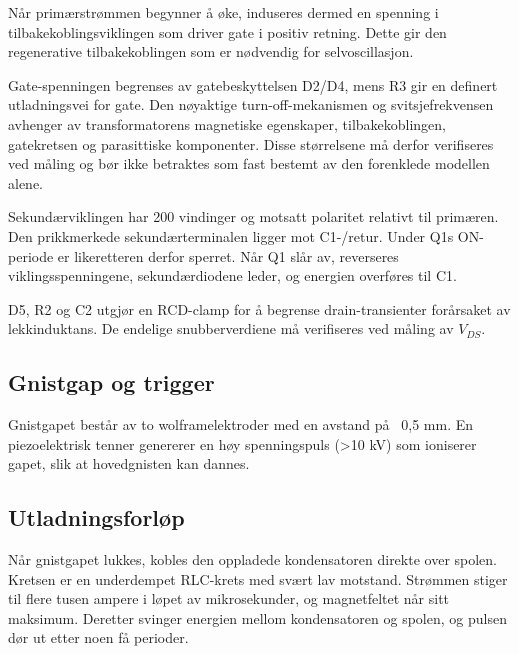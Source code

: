 \documentclass{article}
\begin{document}
Når primærstrømmen begynner å øke, induseres dermed en spenning i
tilbakekoblingsviklingen som driver gate i positiv retning. Dette gir den
regenerative tilbakekoblingen som er nødvendig for selvoscillasjon.

Gate-spenningen begrenses av gatebeskyttelsen D2/D4, mens R3 gir en definert
utladningsvei for gate. Den nøyaktige turn-off-mekanismen og
svitsjefrekvensen avhenger av transformatorens magnetiske egenskaper,
tilbakekoblingen, gatekretsen og parasittiske komponenter. Disse størrelsene
må derfor verifiseres ved måling og bør ikke betraktes som fast bestemt av
den forenklede modellen alene.

Sekundærviklingen har 200 vindinger og motsatt polaritet relativt til
primæren. Den prikkmerkede sekundærterminalen ligger mot C1-/retur. Under
Q1s ON-periode er likeretteren derfor sperret. Når Q1 slår av, reverseres
viklingsspenningene, sekundærdiodene leder, og energien overføres til C1.

D5, R2 og C2 utgjør en RCD-clamp for å begrense drain-transienter forårsaket
av lekkinduktans. De endelige snubberverdiene må verifiseres ved måling av
$V_{DS}$.

\subsection{Gnistgap og trigger}
Gnistgapet består av to wolframelektroder med en avstand på ~0,5 mm. En piezoelektrisk tenner genererer en høy spenningspuls (>10 kV) som ioniserer gapet, slik at hovedgnisten kan dannes.

\subsection{Utladningsforløp}
Når gnistgapet lukkes, kobles den oppladede kondensatoren direkte over spolen. Kretsen er en underdempet RLC-krets med svært lav motstand. Strømmen stiger til flere tusen ampere i løpet av mikrosekunder, og magnetfeltet når sitt maksimum. Deretter svinger energien mellom kondensatoren og spolen, og pulsen dør ut etter noen få perioder.
\end{document}

